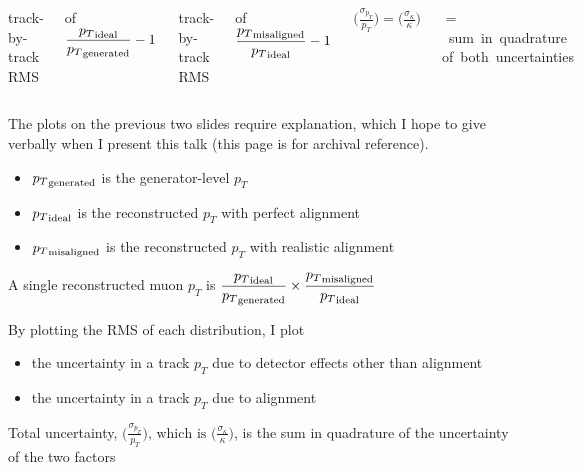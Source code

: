 \documentclass[compress]{beamer}
\begin{document}
\begin{frame}
\begin{columns}
track-by-track RMS

\vspace{0.1 cm}
of $\displaystyle \frac{{p_T}_{\mbox{\scriptsize ideal}}}{{p_T}_{\mbox{\scriptsize generated}}} - 1$

\vspace{0.75 cm}
track-by-track RMS

\vspace{0.1 cm}
of $\displaystyle \frac{{p_T}_{\mbox{\scriptsize misaligned}}}{{p_T}_{\mbox{\scriptsize ideal}}} - 1$

\vspace{1.5 cm}
$\displaystyle \bigg(\frac{\sigma_{p_T}}{p_T}\bigg) = \bigg(\frac{\sigma_\kappa}{\kappa}\bigg)$

\vspace{0.1 cm}
\mbox{$=$ sum in quadrature} \mbox{of both uncertainties}
\end{columns}
\end{frame}

\begin{notes}
\item The plots on the previous two slides require explanation, which
I hope to give verbally when I present this talk (this page is for
archival reference).
\begin{itemize}
\item ${p_T}_{\mbox{\scriptsize generated}}$ is the generator-level $p_T$
\item ${p_T}_{\mbox{\scriptsize ideal}}$ is the reconstructed $p_T$ with perfect alignment
\item ${p_T}_{\mbox{\scriptsize misaligned}}$ is the reconstructed $p_T$ with realistic alignment
\end{itemize}
\item A single reconstructed muon $p_T$ is $\displaystyle \frac{{p_T}_{\mbox{\scriptsize ideal}}}{{p_T}_{\mbox{\scriptsize generated}}} \times \frac{{p_T}_{\mbox{\scriptsize misaligned}}}{{p_T}_{\mbox{\scriptsize ideal}}}$
\item By plotting the RMS of each distribution, I plot
\begin{itemize}
\item the uncertainty in a track $p_T$ due to detector effects other than alignment
\item the uncertainty in a track $p_T$ due to alignment
\end{itemize}
\item Total uncertainty, $\displaystyle \bigg(\frac{\sigma_{p_T}}{p_T}\bigg)\mbox{, which is }\bigg(\frac{\sigma_\kappa}{\kappa}\bigg)$, is the sum in quadrature of the uncertainty of the two factors
\end{notes}
\end{document}

